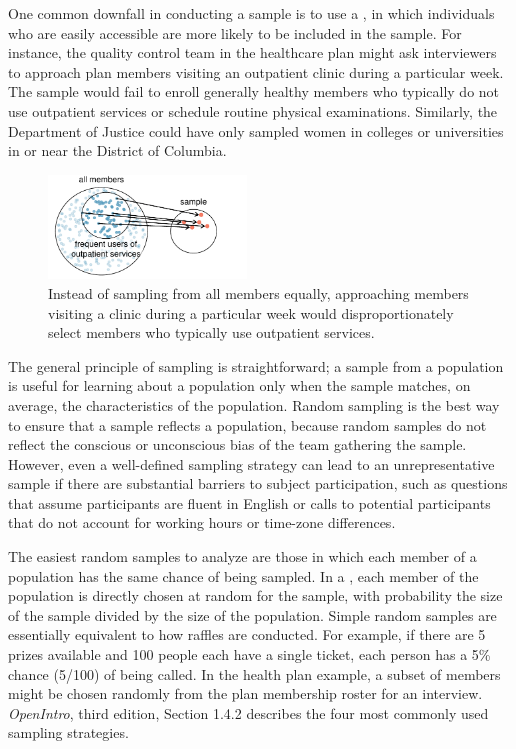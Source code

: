 \begin{doublespace}
One common downfall in conducting a sample is to use a , in which individuals who are easily accessible are more likely to be included in the sample. For instance, the quality control team in the healthcare plan might ask interviewers to approach plan members visiting an outpatient clinic during a particular week.  The sample would fail to enroll generally healthy members who typically do not use outpatient services or schedule routine physical examinations. Similarly, the Department of Justice could have only sampled women in colleges or universities in or near the District of Columbia.

\begin{figure}
	\centering
	\includegraphics[width=0.47\textwidth]{ch_intro_to_data_oi_biostat/figures/sampleHealthPlan/sampleConvenienceHealthPlan}
	\caption{Instead of sampling from all members equally, approaching members visiting a clinic during a particular week would disproportionately select members who typically use outpatient services.}
	\label{sampleConvenienceHealthPlan}
\end{figure}


The general principle of sampling is straightforward; a sample from a population is useful for learning about a population only when the sample matches, on average, the characteristics of the population. Random sampling is the best way to ensure that a sample reflects a population, because random samples do not reflect the conscious or unconscious bias of the team gathering the sample.  However, even a well-defined sampling strategy can lead to an unrepresentative sample if there are substantial barriers to subject participation, such as questions that assume participants are fluent in English or calls to potential participants that do not account for working hours or time-zone differences. 

The easiest random samples to analyze are those in which each member of a population has the same chance of being sampled. In a , each member of the population is directly chosen at random for the sample, with probability the size of the sample divided by the size of the population. Simple random samples are essentially equivalent to how raffles are conducted. For example, if there are 5 prizes available and 100 people each have a single ticket, each person has a 5\% chance (5/100) of being called. In the health plan example, a subset of members might be chosen randomly from the plan membership roster for an interview. \textsl{OpenIntro}, third edition, Section 1.4.2 describes the four most commonly used sampling strategies. 


\end{doublespace}
